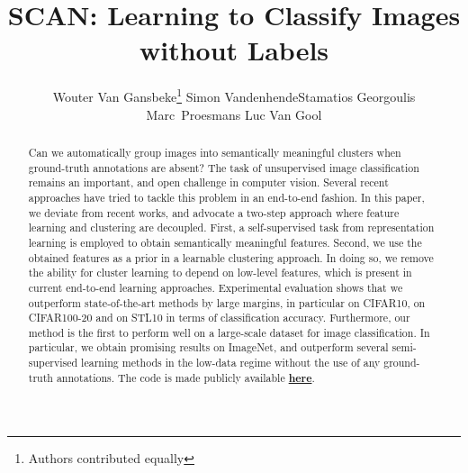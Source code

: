 \documentclass[runningheads]{llncs}
\newcommand*\samethanks[1][\value{footnote}]{\footnotemark[#1]}
\begin{document}
\pagestyle{headings}
\mainmatter
\def\ECCVSubNumber{1057}  

\title{SCAN: Learning to Classify Images without Labels}
\begin{comment}
\titlerunning{ECCV-20 submission ID \ECCVSubNumber} 
\authorrunning{ECCV-20 submission ID \ECCVSubNumber} 
\author{Anonymous ECCV submission}
\institute{Paper ID \ECCVSubNumber}
\end{comment}
\author{Wouter Van Gansbeke\thanks{Authors contributed equally} \quad Simon Vandenhende\samethanks[1] \quad Stamatios Georgoulis\\ \quad Marc~Proesmans \quad Luc Van Gool}




\maketitle
\begin{abstract}
Can we automatically group images into semantically meaningful clusters when ground-truth annotations are absent? The task of unsupervised image classification remains an important, and open challenge in computer vision. Several recent approaches have tried to tackle this problem in an end-to-end fashion. In this paper, we deviate from recent works, and advocate a two-step approach where feature learning and clustering are decoupled. First, a self-supervised task from representation learning is employed to obtain semantically meaningful features. Second, we use the obtained features as a prior in a learnable clustering approach. In doing so, we remove the ability for cluster learning to depend on low-level features, which is present in current end-to-end learning approaches. Experimental evaluation shows that we outperform state-of-the-art methods by large margins, in particular  on CIFAR10,  on CIFAR100-20 and  on STL10 in terms of classification accuracy. Furthermore, our method is the first to perform well on a large-scale dataset for image classification. In particular, we obtain promising results on ImageNet, and outperform several semi-supervised learning methods in the low-data regime without the use of any ground-truth annotations. The code is made publicly available \href{www.github.com/wvangansbeke/Unsupervised-Classification.git}{\textbf{here}}.

\end{abstract}
\end{document}
